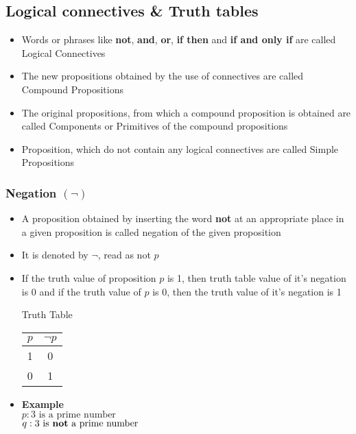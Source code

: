 \documentclass{article}
\begin{document}
	\subsection{Logical connectives \& Truth tables}
	\begin{itemize}
		\item Words or phrases like \textbf{not}, \textbf{and}, \textbf{or}, \textbf{if then}
			and \textbf{if and only if} are called Logical Connectives
		\item The new propositions obtained by the use of connectives are called Compound Propositions
		\item The original propositions, from which a compound proposition is obtained are called
			Components or Primitives of the compound propositions
		\item Proposition, which do not contain any logical connectives are called Simple Propositions
	\end{itemize}

	\subsubsection{Negation $(\neg)$}
	\begin{itemize}
		\item A proposition obtained by inserting the word \textbf{not} at an appropriate place in a
			given proposition is called negation of the given proposition
		\item It is denoted by $\neg$, read as not $p$
		\item If the truth value of proposition $p$ is 1, then truth table value of it's negation is 0
			and if the truth value of $p$ is 0, then the truth value of it's negation is 1
			\begin{center}
				Truth Table \\ \vspace{1em}
				\begin{tabular}{|c|c|} \hline
					$p$ & $\neg p$ \\ \hline
					1 & 0 \\
					0 & 1 \\ \hline
				\end{tabular}
			\end{center}
		\item [] \textbf{Example} \\
			$p : \text{3 is a prime number}$ \\
			$q : \text{3 is \textbf{not} a prime number}$
	\end{itemize} \newpage
\end{document}
